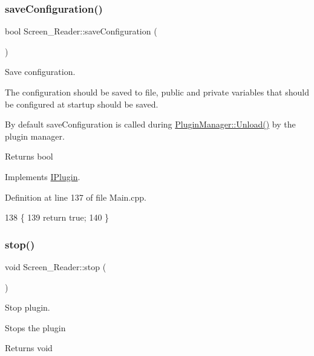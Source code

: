 \subsubsection{\texorpdfstring{save\+Configuration()}{saveConfiguration()}}
{\footnotesize\ttfamily bool Screen\+\_\+\+Reader\+::save\+Configuration (\begin{DoxyParamCaption}{ }\end{DoxyParamCaption})\hspace{0.3cm}{\ttfamily [virtual]}}



Save configuration. 

The configuration should be saved to file, public and private variables that should be configured at startup should be saved.

By default save\+Configuration is called during \hyperlink{class_plugin_manager_ab651a05d6fcb92562807e9f5ecc30855}{Plugin\+Manager\+::\+Unload()} by the plugin manager.

\begin{DoxyReturn}{Returns}
bool 
\end{DoxyReturn}


Implements \hyperlink{class_i_plugin_a79b5c42b1c7b08257a6110b2091039bc}{I\+Plugin}.



Definition at line 137 of file Main.\+cpp.


\begin{DoxyCode}
138 \{
139     \textcolor{keywordflow}{return} \textcolor{keyword}{true};
140 \}
\end{DoxyCode}
\mbox{\label{class_screen___reader_a40e260696012cdb8ab05d65511b7de6e}} 
\subsubsection{\texorpdfstring{stop()}{stop()}}
{\footnotesize\ttfamily void Screen\+\_\+\+Reader\+::stop (\begin{DoxyParamCaption}{ }\end{DoxyParamCaption})\hspace{0.3cm}{\ttfamily [virtual]}}



Stop plugin. 

Stops the plugin \begin{DoxyReturn}{Returns}
void 
\end{DoxyReturn}


